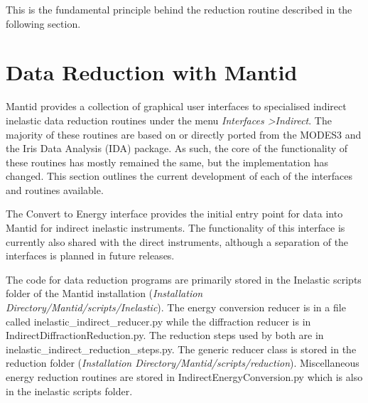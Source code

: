 \documentclass[paper=a4, fontsize=11pt]{scrartcl}	%
\numberwithin{equation}{section}															%
\numberwithin{figure}{section}																%
\numberwithin{table}{section}																%
\begin{document}
This is the fundamental principle behind the reduction routine described in the following section.
%

\section{Data Reduction with Mantid}
Mantid provides a collection of graphical user interfaces to specialised indirect inelastic data reduction routines under the menu \textit{Interfaces \textgreater Indirect}. The majority of these routines are based on or directly ported from the MODES3 and the Iris Data Analysis (IDA) package\cite{wshowells2010}. As such, the core of the functionality of these routines has mostly remained the same, but the implementation has changed. This section outlines the current development of each of the interfaces and routines available.

The Convert to Energy interface provides the initial entry point for data into Mantid for indirect inelastic instruments. The functionality of this interface is currently also shared with the direct instruments, although a separation of the interfaces is planned in future releases.

The code for data  reduction programs are primarily stored in the Inelastic scripts folder of the Mantid installation (\textit{Installation Directory/Mantid/scripts/Inelastic}). The energy conversion reducer is in a file called inelastic\_indirect\_reducer.py while the diffraction reducer is in IndirectDiffractionReduction.py. The reduction steps used by both are in inelastic\_indirect\_reduction\_steps.py. The generic reducer class is stored in the reduction folder (\textit{Installation Directory/Mantid/scripts/reduction}). Miscellaneous energy reduction routines are stored in IndirectEnergyConversion.py which is also in the inelastic scripts folder.
\end{document}
